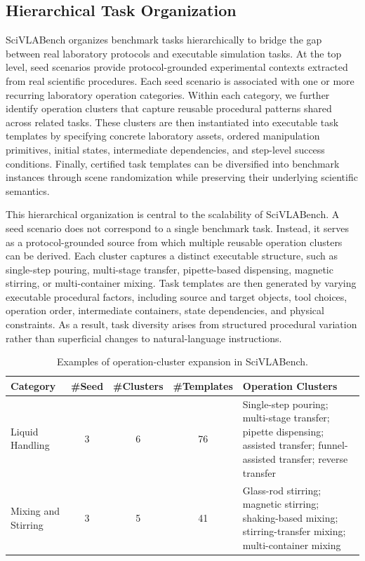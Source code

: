 \subsection{Hierarchical Task Organization}
\label{sec:hierarchical-task-organization}

SciVLABench organizes benchmark tasks hierarchically to bridge the gap between real laboratory protocols and executable simulation tasks. At the top level, seed scenarios provide protocol-grounded experimental contexts extracted from real scientific procedures. Each seed scenario is associated with one or more recurring laboratory operation categories. Within each category, we further identify operation clusters that capture reusable procedural patterns shared across related tasks. These clusters are then instantiated into executable task templates by specifying concrete laboratory assets, ordered manipulation primitives, initial states, intermediate dependencies, and step-level success conditions. Finally, certified task templates can be diversified into benchmark instances through scene randomization while preserving their underlying scientific semantics.

This hierarchical organization is central to the scalability of SciVLABench. A seed scenario does not correspond to a single benchmark task. Instead, it serves as a protocol-grounded source from which multiple reusable operation clusters can be derived. Each cluster captures a distinct executable structure, such as single-step pouring, multi-stage transfer, pipette-based dispensing, magnetic stirring, or multi-container mixing. Task templates are then generated by varying executable procedural factors, including source and target objects, tool choices, operation order, intermediate containers, state dependencies, and physical constraints. As a result, task diversity arises from structured procedural variation rather than superficial changes to natural-language instructions.

\begin{table}[t]
  \centering
  \caption{Examples of operation-cluster expansion in SciVLABench.}
  \label{tab:cluster-expansion}
  \small
  \setlength{\tabcolsep}{5pt}
  \renewcommand{\arraystretch}{1.15}
  \begin{tabular}{p{2.8cm} c c c p{7.8cm}}
    \toprule
    \textbf{Category} & \textbf{\#Seed} & \textbf{\#Clusters} & \textbf{\#Templates} & \textbf{Operation Clusters} \\
    \midrule
    Liquid Handling
    & 3
    & 6
    & 76
    & Single-step pouring; multi-stage transfer; pipette dispensing; assisted transfer; funnel-assisted transfer; reverse transfer \\

    Mixing and Stirring
    & 3
    & 5
    & 41
    & Glass-rod stirring; magnetic stirring; shaking-based mixing; stirring-transfer mixing; multi-container mixing \\
    \bottomrule
  \end{tabular}
\end{table}

